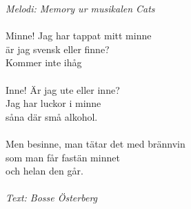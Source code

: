 {\footnotesize\textit{Melodi: Memory ur musikalen Cats}}\\
\\
Minne! Jag har tappat mitt minne\\
är jag svensk eller finne?\\
Kommer inte ihåg\\
\\
Inne! Är jag ute eller inne?\\
Jag har luckor i minne\\
såna där små alkohol.\\
\\
Men besinne, man tätar det med brännvin \\
som man får fastän minnet \\
och helan den går.\\
\\
{\footnotesize\textit{Text: Bosse Österberg}}
